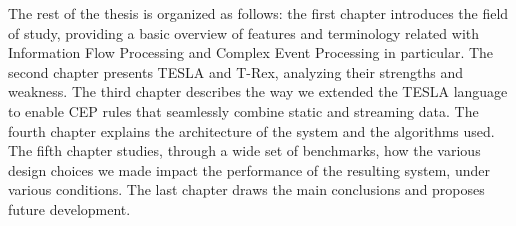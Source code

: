 The rest of the thesis is organized as follows: the first chapter introduces the field of study, providing a basic overview of features and terminology related with Information Flow Processing and Complex Event Processing in particular. The second chapter presents TESLA and T-Rex, analyzing their strengths and weakness. The third chapter describes the way we extended the TESLA language to enable CEP rules that seamlessly combine static and streaming data. The fourth chapter explains the architecture of the system and the algorithms used. The fifth chapter studies, through a wide set of benchmarks, how the various design choices we made impact the performance of the resulting system, under various conditions. The last chapter draws the main conclusions and proposes future development.

\enlargethispage{2\baselineskip}